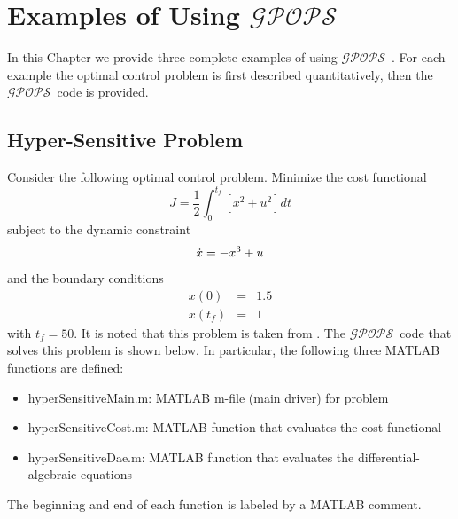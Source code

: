 \documentclass[10pt,final]{report}
\newcommand{\gpops}{$\mathcal{GPOPS}$~}
\newcounter{example}[chapter]
\newenvironment{shadedframe}{%
  \def\FrameCommand{\fcolorbox{black}{shadecolor}}%
  \MakeFramed {\FrameRestore}}
{\endMakeFramed}
\begin{document}
\chapter{Examples of Using \gpops}

In this Chapter we provide three complete examples of using \gpops.  For
each example the optimal control problem is first described quantitatively,
then the \gpops code is provided.

\section{Hyper-Sensitive Problem}

\vspace{12pt}

Consider the following optimal control problem.  Minimize the cost functional
\begin{equation}
  J = \frac{1}{2} \int_0^{t_f} \left[ x^2 + u^2 \right] dt
\end{equation}
subject to the dynamic constraint
\begin{equation}
  \dot{x} = -x^3 + u
\end{equation}
and the boundary conditions
\begin{equation}
  \begin{array}{lcl}
    x(0) & = & 1.5 \\
    x(t_f) & = & 1
  \end{array}
\end{equation}
with $t_f=50$.  It is noted that this problem is taken from
.  The \gpops code that solves this problem
is shown below.  In particular, the following three MATLAB functions
are defined:
\begin{itemize}
  \item hyperSensitiveMain.m: MATLAB m-file (main driver) for problem
  \item hyperSensitiveCost.m: MATLAB function that evaluates the cost functional
  \item hyperSensitiveDae.m:  MATLAB function that evaluates the differential-algebraic equations
\end{itemize}
The beginning and end of each function is labeled by a MATLAB comment.
\footnotesize
\begin{shadedframe}



\end{shadedframe}
\end{document}
